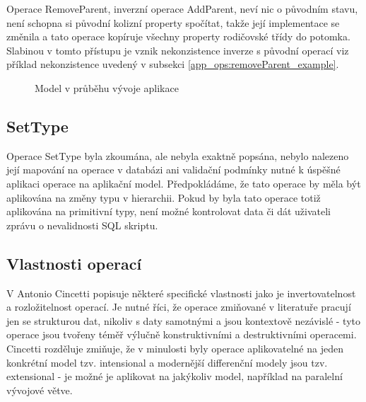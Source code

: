 \documentclass[11pt,twoside,a4paper]{book}
\begin{document}
Operace RemoveParent, inverzní operace AddParent, neví nic o původním stavu,
není schopna si původní kolizní property spočítat, takže její implementace se
změnila a tato operace kopíruje všechny property rodičovské třídy do potomka.
Slabinou v tomto přístupu je vznik nekonzistence inverze s původní operací viz
příklad nekonzistence uvedený v subsekci \ref{app_ops:removeParent_example}.

\begin{figure}
\centering
{}
\caption{Model v průběhu vývoje aplikace}
\label{fig:finalization:addParent_source}
\end{figure}
\FloatBarrier


\subsection{SetType}
Operace SetType byla zkoumána, ale nebyla exaktně popsána, nebylo nalezeno
její mapování na operace v databázi ani validační podmínky nutné k úspěšné
aplikaci operace na aplikační model. Předpokládáme, že tato operace by měla být
aplikována na změny typu v hierarchii. Pokud by byla tato operace totiž
aplikována na primitivní typy, není možné kontrolovat data či dát uživateli
zprávu o nevalidnosti SQL skriptu.

\subsection{Vlastnosti operací}
V \cite{Cincetti} Antonio Cincetti popisuje některé specifické vlastnosti
jako je invertovatelnost a rozložitelnost operací. Je nutné říci, že operace
zmiňované v literatuře pracují jen se strukturou dat, nikoliv s daty samotnými
a jsou kontextově nezávislé - tyto operace jsou tvořeny téměř výlučně
konstruktivními a  destruktivními operacemi. Cincetti rozděluje zmiňuje, že v
minulosti byly operace aplikovatelné na jeden konkrétní model tzv. intensional
a modernější differenční modely jsou tzv. extensional - je možné je aplikovat na
jakýkoliv model, například na paralelní vývojové větve.
\end{document}
